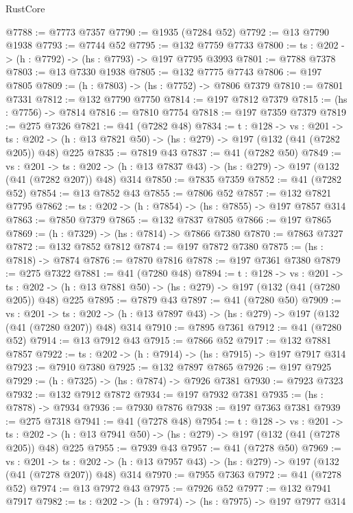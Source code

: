 \begin{lexlean}{RustCore}
\begin{coremodule}
@7788 := @7773 @7357
@7790 := @1935 (@7284 @52)
@7792 := @13 @7790 @1938
@7793 := @7744 @52
@7795 := @132 @7759 @7733
@7800 := {ts : @202} -> (h : @7792) -> (hs : @7793) -> @197 @7795 @3993
@7801 := @7788 @7378
@7803 := @13 @7330 @1938
@7805 := @132 @7775 @7743
@7806 := @197 @7805
@7809 := (h : @7803) -> (hs : @7752) -> @7806 @7379
@7810 := @7801 @7331
@7812 := @132 @7790 @7750
@7814 := @197 @7812 @7379
@7815 := (hs : @7756) -> @7814
@7816 := @7810 @7754
@7818 := @197 @7359 @7379
@7819 := @275 @7326
@7821 := @41 (@7282 @48)
@7834 := {t : @128} ->
  {vs : @201} ->
  {ts : @202} -> (h : @13 @7821 @50) -> (hs : @279) -> @197 (@132 (@41 (@7282 @205)) @48) @225
@7835 := @7819 @43
@7837 := @41 (@7282 @50)
@7849 := {vs : @201} ->
  {ts : @202} -> (h : @13 @7837 @43) -> (hs : @279) -> @197 (@132 (@41 (@7282 @207)) @48) @314
@7850 := @7835 @7359
@7852 := @41 (@7282 @52)
@7854 := @13 @7852 @43
@7855 := @7806 @52
@7857 := @132 @7821 @7795
@7862 := {ts : @202} -> (h : @7854) -> (hs : @7855) -> @197 @7857 @314
@7863 := @7850 @7379
@7865 := @132 @7837 @7805
@7866 := @197 @7865
@7869 := (h : @7329) -> (hs : @7814) -> @7866 @7380
@7870 := @7863 @7327
@7872 := @132 @7852 @7812
@7874 := @197 @7872 @7380
@7875 := (hs : @7818) -> @7874
@7876 := @7870 @7816
@7878 := @197 @7361 @7380
@7879 := @275 @7322
@7881 := @41 (@7280 @48)
@7894 := {t : @128} ->
  {vs : @201} ->
  {ts : @202} -> (h : @13 @7881 @50) -> (hs : @279) -> @197 (@132 (@41 (@7280 @205)) @48) @225
@7895 := @7879 @43
@7897 := @41 (@7280 @50)
@7909 := {vs : @201} ->
  {ts : @202} -> (h : @13 @7897 @43) -> (hs : @279) -> @197 (@132 (@41 (@7280 @207)) @48) @314
@7910 := @7895 @7361
@7912 := @41 (@7280 @52)
@7914 := @13 @7912 @43
@7915 := @7866 @52
@7917 := @132 @7881 @7857
@7922 := {ts : @202} -> (h : @7914) -> (hs : @7915) -> @197 @7917 @314
@7923 := @7910 @7380
@7925 := @132 @7897 @7865
@7926 := @197 @7925
@7929 := (h : @7325) -> (hs : @7874) -> @7926 @7381
@7930 := @7923 @7323
@7932 := @132 @7912 @7872
@7934 := @197 @7932 @7381
@7935 := (hs : @7878) -> @7934
@7936 := @7930 @7876
@7938 := @197 @7363 @7381
@7939 := @275 @7318
@7941 := @41 (@7278 @48)
@7954 := {t : @128} ->
  {vs : @201} ->
  {ts : @202} -> (h : @13 @7941 @50) -> (hs : @279) -> @197 (@132 (@41 (@7278 @205)) @48) @225
@7955 := @7939 @43
@7957 := @41 (@7278 @50)
@7969 := {vs : @201} ->
  {ts : @202} -> (h : @13 @7957 @43) -> (hs : @279) -> @197 (@132 (@41 (@7278 @207)) @48) @314
@7970 := @7955 @7363
@7972 := @41 (@7278 @52)
@7974 := @13 @7972 @43
@7975 := @7926 @52
@7977 := @132 @7941 @7917
@7982 := {ts : @202} -> (h : @7974) -> (hs : @7975) -> @197 @7977 @314

\end{coremodule}
\end{lexlean}
